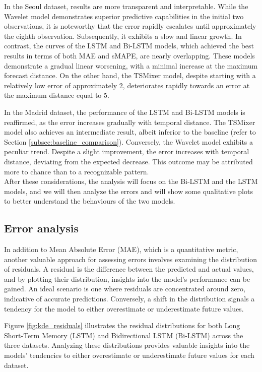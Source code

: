 In the Seoul dataset, results are more transparent and interpretable. While the Wavelet model demonstrates superior predictive capabilities in the initial two observations, it is noteworthy that the error rapidly escalates until approximately the eighth observation. Subsequently, it exhibits a slow and linear growth. In contrast, the curves of the LSTM and Bi-LSTM models, which achieved the best results in terms of both MAE and sMAPE, are nearly overlapping. These models demonstrate a gradual linear worsening, with a minimal increase at the maximum forecast distance. On the other hand, the TSMixer model, despite starting with a relatively low error of approximately 2, deteriorates rapidly towards an error at the maximum distance equal to 5.

In the Madrid dataset, the performance of the LSTM and Bi-LSTM models is reaffirmed, as the error increases gradually with temporal distance. The TSMixer model also achieves an intermediate result, albeit inferior to the baseline (refer to Section \ref{subsec:baseline_comparison}). Conversely, the Wavelet model exhibits a peculiar trend. Despite a slight improvement, the error increases with temporal distance, deviating from the expected decrease. This outcome may be attributed more to chance than to a recognizable pattern.\\

After these considerations, the analysis will focus on the Bi-LSTM and the LSTM models, and we will then analyze the errors and will show some qualitative plots to better understand the behaviours of the two models.

\subsection{Error analysis}

In addition to Mean Absolute Error (MAE), which is a quantitative metric, another valuable approach for assessing errors involves examining the distribution of residuals. A residual is the difference between the predicted and actual values, and by plotting their distribution, insights into the model's performance can be gained. An ideal scenario is one where residuals are concentrated around zero, indicative of accurate predictions. Conversely, a shift in the distribution signals a tendency for the model to either overestimate or underestimate future values.

Figure \ref{fig:kde_residuals} illustrates the residual distributions for both Long Short-Term Memory (LSTM) and Bidirectional LSTM (Bi-LSTM) across the three datasets. Analyzing these distributions provides valuable insights into the models' tendencies to either overestimate or underestimate future values for each dataset.

